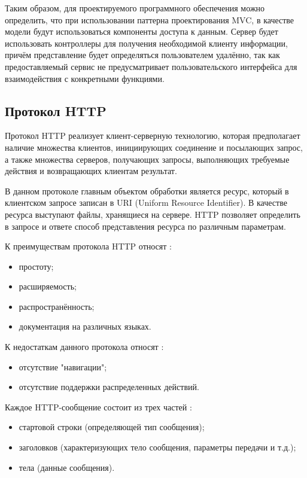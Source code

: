 Таким образом, для проектируемого программного обеспечения можно определить, что при использовании паттерна проектирования MVC, в качестве модели будут использоваться компоненты доступа к данным. Сервер будет использовать контроллеры для получения необходимой клиенту информации, причём представление будет определяться пользователем удалённо, так как предоставляемый сервис не предусматривает пользовательского интерфейса для взаимодействия с конкретными функциями.

\subsection{Протокол HTTP}
Протокол HTTP реализует клиент-серверную технологию, которая предполагает наличие множества клиентов, инициирующих соединение и посылающих запрос, а также множества серверов, получающих запросы, выполняющих требуемые действия и возвращающих клиентам результат. \cite{http}

В данном протоколе главным объектом обработки является ресурс, который в клиентском запросе записан в URI (Uniform Resource Identifier). В качестве ресурса выступают файлы, хранящиеся на сервере. HTTP позволяет определить в запросе и ответе способ представления ресурса по различным параметрам. \cite{http}

К преимуществам протокола HTTP относят \cite{http}:
\begin{itemize}[leftmargin=1.6\parindent]
\item простоту;
\item расширяемость;
\item распространённость;
\item документация на различных языках.
\end{itemize}

К недостаткам данного протокола относят \cite{http}:
\begin{itemize}[leftmargin=1.6\parindent]
\item отсутствие "навигации";
\item отсутствие поддержки распределенных действий.
\end{itemize}

Каждое HTTP-сообщение состоит из трех частей \cite{http11}:
\begin{itemize}[leftmargin=1.6\parindent]
\item стартовой строки (определяющей тип сообщения);
\item заголовков (характеризующих тело сообщения, параметры передачи и т.д.);
\item тела (данные сообщения).
\end{itemize}

